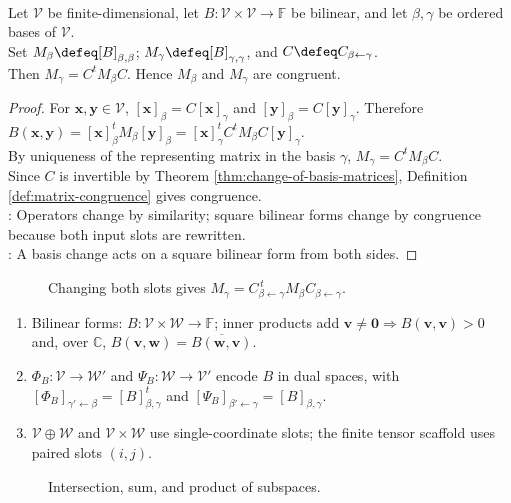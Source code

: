\begin{proposition} \label{prop:square-bilinear-form-change-of-basis-congruence} \\
Let $\mathcal{V}$ be finite-dimensional, let $B:\mathcal{V}\times\mathcal{V}\to\mathbb{F}$ be bilinear, and let $\beta,\gamma$ be ordered bases of $\mathcal{V}$.\\
Set $M_{\beta}\defeq [B]_{\beta,\beta}$; $M_{\gamma}\defeq [B]_{\gamma,\gamma}$, and $C\defeq C_{\beta\leftarrow\gamma}$.\\
Then $M_{\gamma}=C^tM_{\beta}C$. Hence $M_{\beta}$ and $M_{\gamma}$ are congruent.
\begin{proof}
For $\mathbf{x},\mathbf{y}\in\mathcal{V}$, $[\mathbf{x}]_{\beta}=C[\mathbf{x}]_{\gamma}$ and $[\mathbf{y}]_{\beta}=C[\mathbf{y}]_{\gamma}$. Therefore $B(\mathbf{x},\mathbf{y}) =[\mathbf{x}]_{\beta}^{t}M_{\beta}[\mathbf{y}]_{\beta} =[\mathbf{x}]_{\gamma}^{t}C^tM_{\beta}C[\mathbf{y}]_{\gamma}$.\\
By uniqueness of the representing matrix in the basis $\gamma$, $M_{\gamma}=C^tM_{\beta}C$.\\
Since $C$ is invertible by Theorem \ref{thm:change-of-basis-matrices}, Definition \ref{def:matrix-congruence} gives congruence.\\
: Operators change by similarity; square bilinear forms change by congruence because both input slots are rewritten.\\
: A basis change acts on a square bilinear form from both sides.
\end{proof}
\end{proposition}

\begin{figure}[H]
  \centering
  
  \caption{Changing both slots gives $M_{\gamma}=C_{\beta\leftarrow\gamma}^{\,t}M_{\beta}C_{\beta\leftarrow\gamma}$.}
  \label{fig:bilinear-form-congruence-basis-change}
\end{figure}

\begin{perspective} \label{per:bilinear-forms-and-inner-products-scope} 
\begin{enumerate}[label=(\roman*)]
\setlength{\itemsep}{0pt}
\item Bilinear forms: $B:\mathcal{V}\times\mathcal{W}\to\mathbb{F}$; inner products add $\mathbf{v}\neq\mathbf{0}\Rightarrow B(\mathbf{v},\mathbf{v})>0$ and, over $\mathbb{C}$, $B(\mathbf{v},\mathbf{w})=\overline{B(\mathbf{w},\mathbf{v})}$.
\item $\Phi_B:\mathcal{V}\to\mathcal{W}'$ and $\Psi_B:\mathcal{W}\to\mathcal{V}'$ encode $B$ in dual spaces, with $[\Phi_B]_{\gamma'\leftarrow\beta}=[B]_{\beta,\gamma}^t$ and $[\Psi_B]_{\beta'\leftarrow\gamma}=[B]_{\beta,\gamma}$.
\item $\mathcal{V}\oplus\mathcal{W}$ and $\mathcal{V}\times\mathcal{W}$ use single-coordinate slots; the finite tensor scaffold uses paired slots $(i,j)$.
\end{enumerate}
\end{perspective}

\begin{figure}[H]
  \centering
  
  \caption{Intersection, sum, and product of subspaces.}
  \label{fig:subspace-sum-product-schematic}
\end{figure}
